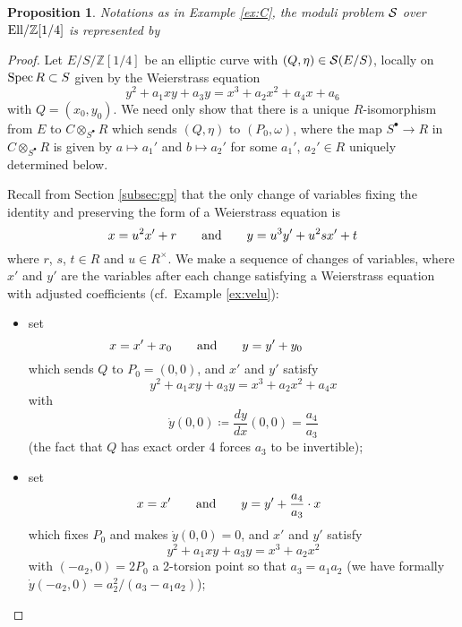 \documentclass{gtpart}
\newtheorem{prop}[thm]{Proposition}
\theoremstyle{definition}
\theoremstyle{remark}
\newcommand{\mb}[1]{\mathbb{#1}}
\newcommand{\Spec}{{\rm Spec\thinspace}}
\newcommand{\Proj}{{\rm Proj\thinspace}}
\newcommand{\Ell}{{\rm Ell}}
\newcommand{\CS}{{\cal S}}
\newcommand{\BZ}{{\mb Z}}
\newcommand{\ad}{{\rm and}}
\newcommand{\s}{S^\bullet}
\newcommand{\ce}{\coloneqq}
\numberwithin{equation}{section}
\numberwithin{thm}{section}
\begin{document}
\begin{prop}
\label{prop:C}
 Notations as in Example \ref{ex:C}, the moduli problem $\CS$ over 
 $\Ell/\BZ[1/4]$ is represented by 
 \begin{center}
 \end{center}
\end{prop}
\begin{proof}
 Let $E/S/\BZ[1/4]$ be an elliptic curve with $(Q,\eta) \in \CS(E/S)$, 
 locally on $\Spec R \subset S$ given by the Weierstrass equation 
 \[
  y^2 + a_1 x y + a_3 y = x^3 + a_2 x^2 + a_4 x + a_6 
 \]
 with $Q = (x_0,y_0)$.  We need only show that there is a unique 
 $R$-isomorphism from $E$ to $C \otimes_{\s} R$ which sends $(Q,\eta)$ 
 to $(P_0,\omega)$, where the map $\s \to R$ in $C \otimes_{\s} R$ is 
 given by $a \mapsto a_1'$ and $b \mapsto a_2'$ for some $a_1'$, 
 $a_2' \in R$ uniquely determined below.  

 Recall from Section \ref{subsec:gp} that the only change of variables 
 fixing the identity and preserving the form of a Weierstrass equation 
 is 
 \begin{equation}
 \label{change}
  x = u^2 x' + r \qquad \ad \qquad y = u^3 y' + u^2 s x' + t 
 \end{equation}
 where $r$, $s$, $t \in R$ and $u \in R^\times$.  We make a sequence of 
 changes of variables, where $x'$ and $y'$ are the variables after each 
 change satisfying a Weierstrass equation with adjusted coefficients 
 (cf.~Example \ref{ex:velu}): 
 \begin{itemize}
  \item set 
  \[
   x = x' + x_0 \qquad \ad \qquad y = y' + y_0 \qquad \qquad \quad ~~~
  \]
  which sends $Q$ to $P_0 = (0,0)$, and $x'$ and $y'$ satisfy 
  \[
   y^2 + a_1 x y + a_3 y = x^3 + a_2 x^2 + a_4 x 
  \]
  with 
  \[
   \dot{y}(0,0) \ce \frac{dy}{dx}(0,0) = \frac{a_4}{a_3} 
  \]
  (the fact that $Q$ has exact order 4 forces $a_3$ to be invertible); 

  \item set 
  \[
   x = x' \qquad \ad \qquad y = y' + \frac{a_4}{a_3} \cdot x \qquad ~
  \]
  which fixes $P_0$ and makes $\dot{y}(0,0) = 0$, and $x'$ and $y'$ 
  satisfy 
  \[
   y^2 + a_1 x y + a_3 y = x^3 + a_2 x^2 
  \]
  with $(-a_2,0) = 2 P_0$ a 2-torsion point so that $a_3 = a_1 a_2$ (we 
  have formally $\dot{y}(-a_2,0) = a_2^2 / (a_3 - a_1 a_2)$); 


\end{itemize}
\end{proof}
\end{document}
